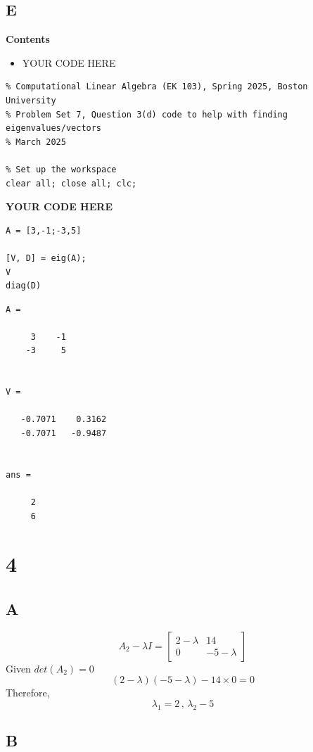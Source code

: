 \documentclass{article}
\begin{document}
\subsection*{E}

\textbf{Contents}

\begin{itemize}
	\setlength{\itemsep}{-1ex}
	\item YOUR CODE HERE
\end{itemize}
\begin{verbatim}
% Computational Linear Algebra (EK 103), Spring 2025, Boston University
% Problem Set 7, Question 3(d) code to help with finding eigenvalues/vectors
% March 2025

% Set up the workspace
clear all; close all; clc;
\end{verbatim}


\textbf{YOUR CODE HERE}

\begin{verbatim}
A = [3,-1;-3,5]

[V, D] = eig(A);
V
diag(D)
\end{verbatim}

\color{lightgray} \begin{verbatim}
A =

     3    -1
    -3     5


V =

   -0.7071    0.3162
   -0.7071   -0.9487


ans =

     2
     6

\end{verbatim} \color{black}

\section{4}

\subsection*{A}

\[
	A_2 - \lambda I =
	\begin{bmatrix}
		2 - \lambda & 14           \\
		0           & -5 - \lambda
	\end{bmatrix}
\]
Given \(det(A_2) = 0\)
\[
	(2 - \lambda)(-5 - \lambda) - 14 \times 0 = 0
\]
Therefore,
\[
	\lambda_1 = 2 \, , \, \lambda_2 -5
\]

\subsection*{B}
\end{document}
